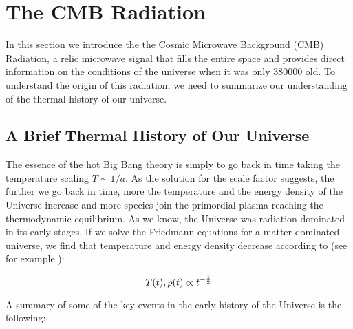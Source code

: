 \section{The CMB Radiation}

In this section we introduce the the Cosmic Microwave
Background (CMB) Radiation, a relic microwave signal that fills the entire
space and provides direct information on the conditions of the universe
when it was only \SI{380000}{\year} old. To understand the origin of this
radiation, we need to summarize our understanding of the thermal history of
our universe.

\subsection{A Brief Thermal History of Our Universe}\label{ss:brief_thermal_history}

The essence of the hot Big Bang theory is simply to go back in time taking
the temperature scaling $T \sim 1/a$. As the solution for the scale factor
suggests, the further we go back in time, more the temperature and the
energy density of the Universe increase and more species join the
primordial plasma reaching the thermodynamic equilibrium. As we know, the
Universe was radiation-dominated in its early stages. If we solve the
Friedmann equations for a matter dominated universe, we find that
temperature and energy density decrease according to (see for example
\cite{tong2019lectures}):

\begin{equation}
        T\qty(t), \rho\qty(t) \propto t^{-\frac{1}{2}}
\end{equation}

A summary of some of the key events in the early history of the Universe
is the following:

